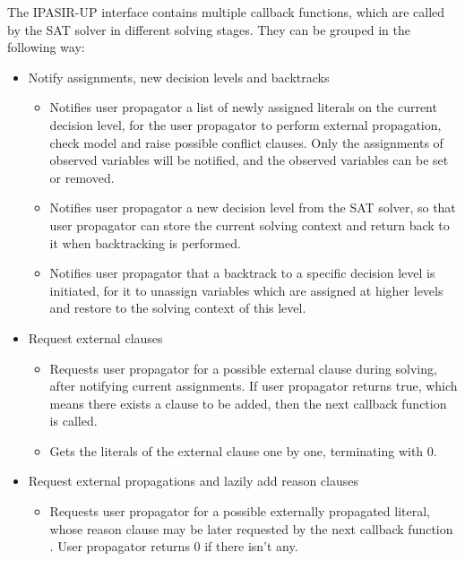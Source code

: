 The IPASIR-UP interface contains multiple callback functions, which are called by the SAT solver in different solving stages. They can be grouped in the following way:

\begin{itemize}
  \item Notify assignments, new decision levels and backtracks
    \begin{itemize}
      \item {} Notifies user propagator a list of newly assigned literals on the current decision level, for the user propagator to perform external propagation, check model and raise possible conflict clauses. Only the assignments of observed variables will be notified, and the observed variables can be set or removed.
      \item {} Notifies user propagator a new decision level from the SAT solver, so that user propagator can store the current solving context and return back to it when backtracking is performed.
      \item {} Notifies user propagator that a backtrack to a specific decision level is initiated, for it to unassign variables which are assigned at higher levels and restore to the solving context of this level.
    \end{itemize}
  \item Request external clauses
    \begin{itemize}
      \item {} Requests user propagator for a possible external clause during solving, after notifying current assignments. If user propagator returns true, which means there exists a clause to be added, then the next callback function  is called.
      \item {} Gets the literals of the external clause one by one, terminating with 0.  
    \end{itemize}
  \item Request external propagations and lazily add reason clauses
    \begin{itemize}
      \item {} Requests user propagator for a possible externally propagated literal, whose reason clause may be later requested by the next callback function . User propagator returns 0 if there isn't any.

\end{itemize}
\end{itemize}
